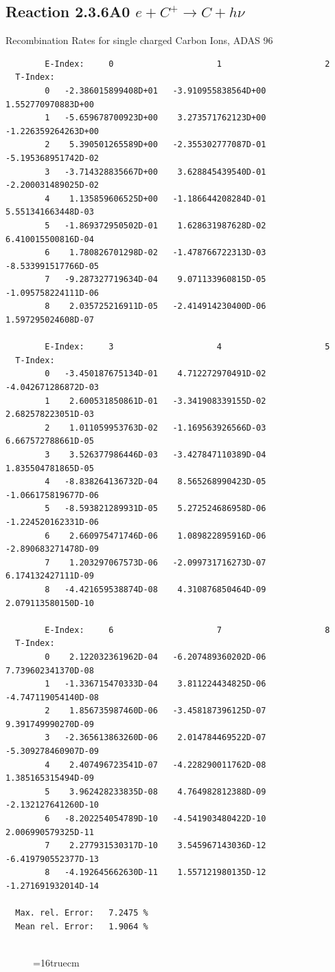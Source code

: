 \documentclass[12pt,dvips]{article}
\begin{document}
\subsection{
Reaction 2.3.6A0  $e + C^{+} \rightarrow C + h\nu$
}
 Recombination Rates for single
 charged Carbon Ions, ADAS 96

\begin{small}\begin{verbatim}
        E-Index:     0                     1                     2
  T-Index:
        0   -2.386015899408D+01   -3.910955838564D+00    1.552770970883D+00
        1   -5.659678700923D+00    3.273571762123D+00   -1.226359264263D+00
        2    5.390501265589D+00   -2.355302777087D-01   -5.195368951742D-02
        3   -3.714328835667D+00    3.628845439540D-01   -2.200031489025D-02
        4    1.135859606525D+00   -1.186644208284D-01    5.551341663448D-03
        5   -1.869372950502D-01    1.628631987628D-02    6.410015500816D-04
        6    1.780826701298D-02   -1.478766722313D-03   -8.533991517766D-05
        7   -9.287327719634D-04    9.071133960815D-05   -1.095758224111D-06
        8    2.035725216911D-05   -2.414914230400D-06    1.597295024608D-07

        E-Index:     3                     4                     5
  T-Index:
        0   -3.450187675134D-01    4.712272970491D-02   -4.042671286872D-03
        1    2.600531850861D-01   -3.341908339155D-02    2.682578223051D-03
        2    1.011059953763D-02   -1.169563926566D-03    6.667572788661D-05
        3    3.526377986446D-03   -3.427847110389D-04    1.835504781865D-05
        4   -8.838264136732D-04    8.565268990423D-05   -1.066175819677D-06
        5   -8.593821289931D-05    5.272524686958D-06   -1.224520162331D-06
        6    2.660975471746D-06    1.089822895916D-06   -2.890683271478D-09
        7    1.203297067573D-06   -2.099731716273D-07    6.174132427111D-09
        8   -4.421659538874D-08    4.310876850464D-09    2.079113580150D-10

        E-Index:     6                     7                     8
  T-Index:
        0    2.122032361962D-04   -6.207489360202D-06    7.739602341370D-08
        1   -1.336715470333D-04    3.811224434825D-06   -4.747119054140D-08
        2    1.856735987460D-06   -3.458187396125D-07    9.391749990270D-09
        3   -2.365613863260D-06    2.014784469522D-07   -5.309278460907D-09
        4    2.407496723541D-07   -4.228290011762D-08    1.385165315494D-09
        5    3.962428233835D-08    4.764982812388D-09   -2.132127641260D-10
        6   -8.202254054789D-10   -4.541903480422D-10    2.006990579325D-11
        7    2.277931530317D-10    3.545967143036D-12   -6.419790552377D-13
        8   -4.192645662630D-11    1.557121980135D-12   -1.271691932014D-14

  Max. rel. Error:   7.2475 %
  Mean rel. Error:   1.9064 %


\end{verbatim}\end{small}
\begin{figure} \label{2.3.6A0}
\epsfxsize=16truecm
\end{figure}
\newpage
\end{document}
